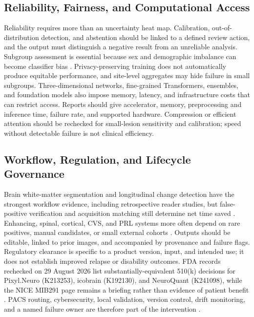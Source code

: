 \documentclass[journal,twoside,web]{ieeecolor}
\begin{document}
\subsection{Reliability, Fairness, and Computational Access}\label{subsec:reliability-fairness-and-computational-access}

Reliability requires more than an uncertainty heat map. Calibration, out-of-distribution detection, and abstention should be linked to a defined review action, and the output must distinguish a negative result from an unreliable analysis. Subgroup assessment is essential because sex and demographic imbalance can become classifier bias \cite{gender_bias}. Privacy-preserving training does not automatically produce equitable performance, and site-level aggregates may hide failure in small subgroups. Three-dimensional networks, fine-grained Transformers, ensembles, and foundation models also impose memory, latency, and infrastructure costs that can restrict access. Reports should give accelerator, memory, preprocessing and inference time, failure rate, and supported hardware. Compression or efficient attention should be rechecked for small-lesion sensitivity and calibration; speed without detectable failure is not clinical efficiency.


\subsection{Workflow, Regulation, and Lifecycle Governance}\label{subsec:workflow-regulation-and-lifecycle-governance}

Brain white-matter segmentation and longitudinal change detection have the strongest workflow evidence, including retrospective reader studies, but false-positive verification and acquisition matching still determine net time saved \cite{salem,msseg_aug,barnett,combes,peters2024,sieber,mastilovic2025}. Enhancing, spinal, cortical, CVS, and PRL systems more often depend on rare positives, manual candidates, or small external cohorts \cite{greselin,gadlesion,larosa7t,molchanova,cvsnet,rimnet,qsmrim,alpaca}. Outputs should be editable, linked to prior images, and accompanied by provenance and failure flags. Regulatory clearance is specific to a product version, input, and intended use; it does not establish improved relapse or disability outcomes. FDA records rechecked on 29 August 2026 list substantially-equivalent 510(k) decisions for Pixyl.Neuro (K213253), icobrain (K192130), and NeuroQuant (K241098), while the NICE MIB291 page remains a briefing rather than evidence of patient benefit \cite{fda_pixyl,fda_icobrain,fda_neuroquant,nice_mib291}. PACS routing, cybersecurity, local validation, version control, drift monitoring, and a named failure owner are therefore part of the intervention \cite{radiology_workflow,imdrf_samd,imdrf_gmlp}.
\end{document}
